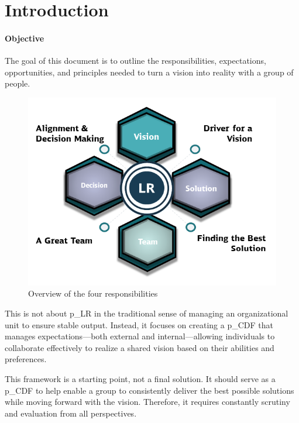 \pagebreak


\section{Introduction}

\paragraph{Objective}
The goal of this document is to outline the responsibilities, expectations, opportunities, and principles needed to turn a vision into reality with a group of people.

\begin{figure}[H]
	\centering
	\includegraphics[scale=0.9]{attachment/chapter_OWN/Rubric_Leadership.png}
	\caption{Overview of the four responsibilities}
\end{figure}

This is not about \gls{p_LR} in the traditional sense of managing an organizational unit to ensure stable output. Instead, it focuses on creating a \gls{p_CDF} that manages expectations—both external and internal—allowing individuals to collaborate effectively to realize a shared vision based on their abilities and preferences.

This framework is a starting point, not a final solution. It should serve as a \gls{p_CDF} to help enable a group to consistently deliver the best possible solutions while moving forward with the vision. Therefore, it requires constantly scrutiny and evaluation from all perspectives.


